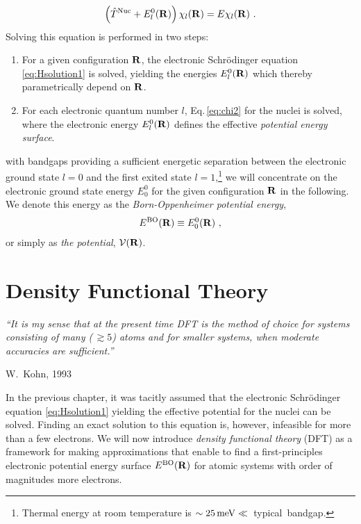 \begin{align}
    \left( \hat{T}^{\rm Nuc} + E^0_l({\bf R}) \right) \chi_l ({\bf R})
        = E \chi_l ({\bf R})~.
    \label{eq:chi2}
\end{align}
Solving this equation is performed in two steps:
\begin{enumerate}
    \item For a given configuration $\bf R$, the electronic Schr\"odinger equation \eqref{eq:Hsolution1} is solved, yielding the energies $E^0_l({\bf R})$ which thereby parametrically depend on $\bf R$.
    \item For each electronic quantum number $l$, Eq.\,\eqref{eq:chi2} for the nuclei is solved, where the electronic energy $E^0_l({\bf R})$ defines the effective \emph{potential energy surface}.
\end{enumerate}

 with bandgaps providing a sufficient energetic separation between the electronic ground state $l=0$ and the first exited state $l=1$,\footnote{Thermal energy at room temperature is \mbox{$\sim 25\,{\rm meV} \ll $~typical bandgap}.} we will concentrate on the electronic ground state energy $E^0_0$ for the given configuration ${\bf R}$ in the following. We denote this energy as the \emph{Born-Oppenheimer potential energy},
\begin{align}
	E^{\rm BO} ({\bf R}) \equiv E^0_0 ({\bf R})~,
	\label{eq:E^BO}
\end{align}
or simply as \emph{the potential}, $\mathcal V ({\bf R}) $.

\newpage
\section{Density Functional Theory}
\epigraph{\singlespacing \it ``It is my sense that at the present time DFT is the method of choice for systems consisting of many (\,$\gtrsim 5$) atoms and for smaller systems, when moderate accuracies are sufficient.''}{W.~Kohn, 1993}

In the previous chapter, it was tacitly assumed that the electronic Schr\"odinger equation \eqref{eq:Hsolution1} yielding the effective potential for the nuclei can be solved. Finding an exact solution to this equation is, however, infeasible for more than a few electrons. We will now introduce \emph{density functional theory} (DFT) as a framework for making approximations that enable to find a first-principles electronic potential energy surface $E^{\rm BO} ({\bf R})$ for atomic systems with order of magnitudes more electrons.

